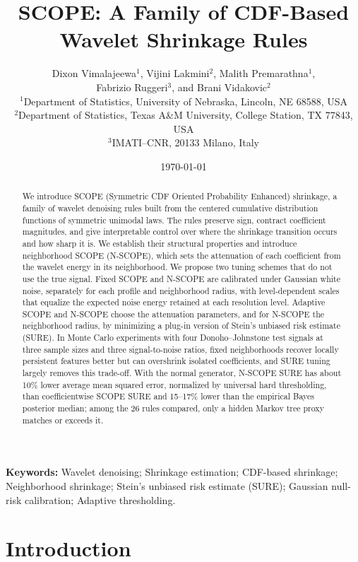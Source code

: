 \documentclass[12pt]{article}
\title{SCOPE: A Family of CDF-Based Wavelet Shrinkage Rules}
\author{Dixon Vimalajeewa$^{1}$, Vijini Lakmini$^{2}$, Malith Premarathna$^{1}$,\\
Fabrizio Ruggeri$^{3}$, and Brani Vidakovic$^{2}$\\[1ex]
{\small $^{1}$Department of Statistics, University of Nebraska, Lincoln, NE 68588, USA}\\
{\small $^{2}$Department of Statistics, Texas A\&M University, College Station, TX 77843, USA}\\
{\small $^{3}$IMATI--CNR, 20133 Milano, Italy}}
\date{\today}
\theoremstyle{definition}
\theoremstyle{definition}
\begin{document}
\maketitle

\begin{abstract}
We introduce SCOPE (Symmetric CDF Oriented Probability Enhanced) shrinkage, a family of wavelet denoising rules built from the centered cumulative distribution functions of symmetric unimodal laws. The rules preserve sign, contract coefficient magnitudes, and give interpretable control over where the shrinkage transition occurs and how sharp it is. We establish their structural properties and introduce neighborhood SCOPE (N-SCOPE), which sets the attenuation of each coefficient from the wavelet energy in its neighborhood. We propose two tuning schemes that do not use the true signal. Fixed SCOPE and N-SCOPE are calibrated under Gaussian white noise, separately for each profile and neighborhood radius, with level-dependent scales that equalize the expected noise energy retained at each resolution level. Adaptive SCOPE and N-SCOPE choose the attenuation parameters, and for N-SCOPE the neighborhood radius, by minimizing a plug-in version of Stein’s unbiased risk estimate (SURE). In Monte Carlo experiments with four Donoho--Johnstone test signals at three sample sizes and three signal-to-noise ratios, fixed neighborhoods recover locally persistent features better but can overshrink isolated coefficients, and SURE tuning largely removes this trade-off. With the normal generator, N-SCOPE SURE has about 10\% lower average mean squared error, normalized by universal hard thresholding, than coefficientwise SCOPE SURE and 15--17\% lower than the empirical Bayes posterior median; among the 26 rules compared, only a hidden Markov tree proxy matches or exceeds it.
\end{abstract}

\medskip
\noindent\textbf{Keywords:} Wavelet denoising; Shrinkage estimation;
CDF-based shrinkage; Neighborhood shrinkage; Stein's unbiased risk
estimate (SURE); Gaussian null-risk calibration; Adaptive thresholding.
 

\section{Introduction}
\label{sec:intro}
\end{document}
